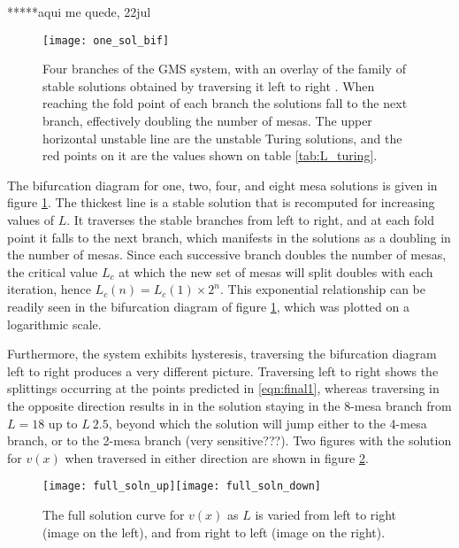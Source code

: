 *****aqui me quede, 22jul

% 
\begin{figure}[htb]
\begin{center}
\texttt{[image: one\_sol\_bif]}
\caption{Four branches of the GMS system, with an overlay of the family of stable solutions obtained by traversing it left to right . When reaching the fold point of each branch the solutions fall to the next branch, effectively doubling the number of mesas. The upper horizontal unstable line are the unstable Turing solutions, and the red points on it are the values shown on table \ref{tab:L_turing}.}
\label{fig:one_sol}
\end{center}
\end{figure}
% 

The bifurcation diagram for one, two, four, and eight mesa solutions is given in figure \ref{fig:one_sol}. The thickest line is a stable solution that is recomputed for increasing values of $L$. It traverses the stable branches from left to right, and at each fold point it falls to the next branch, which manifests in the solutions as a doubling in the number of mesas. Since each successive branch doubles the number of mesas, the critical value $L_c$ at which the new set of mesas will split doubles with each iteration, hence $L_c(n)=L_c(1)\times 2^n$. This exponential relationship can be readily seen in the bifurcation diagram of figure \ref{fig:one_sol}, which was plotted on a logarithmic scale.

Furthermore, the system exhibits hysteresis, traversing the bifurcation diagram left to right produces a very different picture. Traversing left to right shows the splittings occurring at the points predicted in \eqref{eqn:final1}, whereas traversing in the opposite direction results in in the solution staying in the 8-mesa branch from $L=18$ up to $L~2.5$, beyond which the solution will jump either to the 4-mesa branch, or to the 2-mesa branch (very sensitive???). Two figures with the solution for $v(x)$ when traversed in either direction are shown in figure \ref{fig:up_down}.

% 
\begin{figure}[htb]
\begin{center}
\texttt{[image: full\_soln\_up]}\texttt{[image: full\_soln\_down]}
\caption{The full solution curve for $v(x)$ as $L$ is varied from left to right (image on the left), and from right to left (image on the right).}
\label{fig:up_down}
\end{center}
\end{figure}
% 

